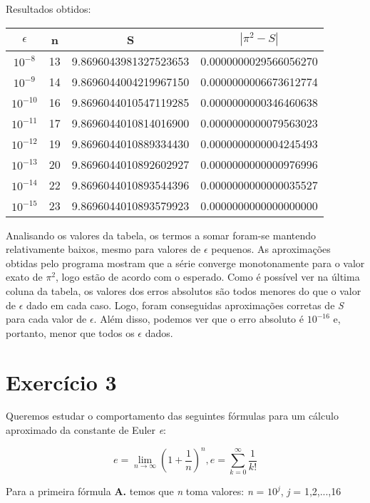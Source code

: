 \documentclass[12pt, letterpaper]{article}
\begin{document}
Resultados obtidos:
\begin{center}
    \begin{tabular}{|| c | c | c | c ||}       \hline
 $\epsilon$ & n & S & $|\pi^2 - S|$\\  [0.4ex] \hline\hline
 $10^{-8}$  & 13 & 9.8696043981327523653 & 0.0000000029566056270 \\  \hline
 $10^{-9}$  & 14 & 9.8696044004219967150 & 0.0000000006673612774 \\  \hline
 $10^{-10}$ & 16 & 9.8696044010547119285 & 0.0000000000346460638 \\  \hline
 $10^{-11}$ & 17 & 9.8696044010814016900 & 0.0000000000079563023 \\  \hline
 $10^{-12}$ & 19 & 9.8696044010889334430 & 0.0000000000004245493 \\  \hline
 $10^{-13}$ & 20 & 9.8696044010892602927 & 0.0000000000000976996 \\  \hline
 $10^{-14}$ & 22 & 9.8696044010893544396 & 0.0000000000000035527 \\  \hline
 $10^{-15}$ & 23 & 9.8696044010893579923 & 0.0000000000000000000 \\ [0.4ex]\hline
    \end{tabular}
\end{center}

Analisando os valores da tabela, os termos a somar foram-se mantendo relativamente baixos, mesmo para valores de $\epsilon$ pequenos. As aproximações obtidas pelo programa mostram que a série converge monotonamente para o valor exato de $\pi^2$, logo estão de acordo com o esperado.
Como é possível ver na última coluna da tabela, os valores dos erros absolutos são todos menores do que o valor de $\epsilon$ dado em cada caso. Logo, foram conseguidas aproximações corretas de \textit{S} para cada valor de $\epsilon$. Além disso, podemos ver que o erro absoluto é $10^{-16}$ e, portanto, menor que todos os $\epsilon$ dados.

\section*{Exercício 3}
Queremos estudar o comportamento das seguintes fórmulas para um cálculo aproximado da constante de Euler \textit{e}:

$$\textit{e} = \lim_{n \to \infty} (1+\frac{1}{n})^n, \textit{e} = \sum_{k=0}^{\infty} \frac{1}{k!}$$

Para a primeira fórmula \textbf{A.} temos que \textit{n} toma valores: \textit{n} = $10^j$, \textit{j} = 1,2,...,16
\end{document}
